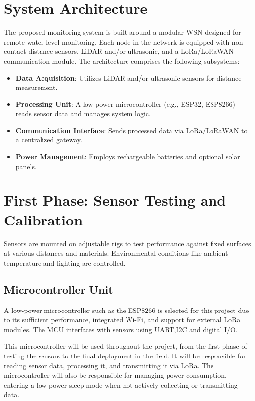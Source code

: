 \section{System Architecture}
The proposed monitoring system is built around a modular \gls{WSN} designed for remote water level monitoring. Each node in the network is equipped with non-contact distance sensors, \gls{LiDAR} and/or ultrasonic, and a \gls{LoRa}/\gls{LoRaWAN} communication module. The architecture comprises the following subsystems:

\begin{itemize}
\item \textbf{Data Acquisition}: Utilizes \gls{LiDAR} and/or ultrasonic sensors for distance measurement.
\item \textbf{Processing Unit}: A low-power microcontroller (e.g., ESP32, ESP8266) reads sensor data and manages system logic.
\item \textbf{Communication Interface}: Sends processed data via \gls{LoRa}/\gls{LoRaWAN} to a centralized gateway.
\item \textbf{Power Management}: Employs rechargeable batteries and optional solar panels.
\end{itemize}

\section{First Phase: Sensor Testing and Calibration} 

Sensors are mounted on adjustable rigs to test performance against fixed surfaces at various distances and materials. Environmental conditions like ambient temperature and lighting are controlled.

\subsection{Microcontroller Unit}
A low-power microcontroller such as the ESP8266 is selected for this project due to its sufficient performance, integrated Wi-Fi, and support for external LoRa modules. The MCU interfaces with sensors using UART,I2C and digital I/O.

This microcontroller will be used throughout the project, from the first phase of testing the sensors to the final deployment in the field. It will be responsible for reading sensor data, processing it, and transmitting it via LoRa. The microcontroller will also be responsible for managing power consumption, entering a low-power sleep mode when not actively collecting or transmitting data.

